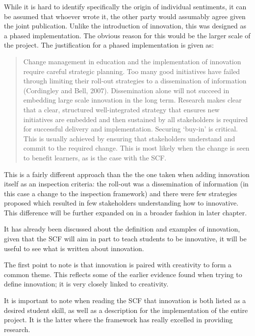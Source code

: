 While it is hard to identify specifically the origin of individual sentiments, it can be assumed that whoever wrote it, the other party would assumably agree given the joint publication. Unlike the introduction of innovation, this was designed as a phased implementation. The obvious reason for this would be the larger scale of the project. The justification for a phased implementation is given as:

\begin{quote}
Change management in education and the implementation of innovation require careful strategic planning. Too many good initiatives have failed through limiting their roll-out strategies to a dissemination of information (Cordingley and Bell, 2007). Dissemination alone will not succeed in embedding large scale innovation in the long term. Research makes clear that a clear, structured well-integrated strategy that ensures new initiatives are embedded and then sustained by all stakeholders is required for successful delivery and implementation. Securing ‘buy-in’ is critical. This is usually achieved by ensuring that stakeholders understand and commit to the required change. This is most likely when the change is seen to benefit learners, as is the case with the SCF.
\end{quote}

This is a fairly different approach than the the one taken when adding innovation itself as an inspection criteria: the roll-out was a dissemination of information (in this case a change to the inspection framework) and there were few strategies proposed which resulted in few stakeholders understanding how to innovative. This difference will be further expanded on in a broader fashion in later chapter.

It has already been discussed about the definition and examples of innovation, given that the SCF will aim in part to teach students to be innovative, it will be useful to see what is written about innovation.

The first point to note is that innovation is paired with creativity to form a common theme. This reflects some of the earlier evidence found when trying to define innovation; it is very closely linked to creativity.

It is important to note when reading the SCF that innovation is both listed as a desired student skill, as well as a description for the implementation of the entire project. It is the latter where the framework has really excelled in providing research.

